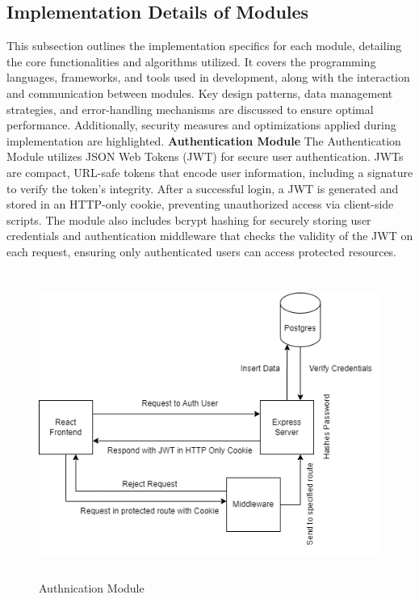 \subsection{Implementation Details of Modules}
This subsection outlines the implementation specifics for each module, detailing the core functionalities and algorithms utilized. It covers the programming languages, frameworks, and tools used in development, along with the interaction and communication between modules. Key design patterns, data management strategies, and error-handling mechanisms are discussed to ensure optimal performance. Additionally, security measures and optimizations applied during implementation are highlighted.
\newline
\newline
\textbf{Authentication Module}
\newline
The Authentication Module utilizes JSON Web Tokens (JWT) for secure user authentication. JWTs are compact, URL-safe tokens that encode user information, including a signature to verify the token's integrity. After a successful login, a JWT is generated and stored in an HTTP-only cookie, preventing unauthorized access via client-side scripts. The module also includes bcrypt hashing for securely storing user credentials and authentication middleware that checks the validity of the JWT on each request, ensuring only authenticated users can access protected resources.
\begin{figure}[H]
   \centering
    \includegraphics[height = 10cm]{Diagrams/auth module.png}
    \caption{Authnication Module}
\end{figure}

